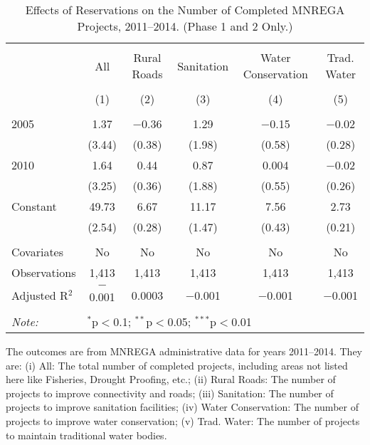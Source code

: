\begin{table}[!htbp]
\centering
\begin{threeparttable}

  \caption{Effects of Reservations on the Number of Completed MNREGA Projects, 2011--2014. (Phase 1 and 2 Only.)} 
  \label{main_mnrega_phase_1_2} 
\scriptsize 
\begin{tabular}{@{\extracolsep{0pt}}lccccc} 
\\[-1.8ex]\hline 
\hline \\[-1.8ex] 
 & All & Rural Roads & Sanitation & Water Conservation & Trad. Water \\ 
\\[-1.8ex] & (1) & (2) & (3) & (4) & (5)\\ 
\hline \\[-1.8ex] 
 2005 & 1.37 & $-$0.36 & 1.29 & $-$0.15 & $-$0.02 \\ 
  & (3.44) & (0.38) & (1.98) & (0.58) & (0.28) \\ 
  2010 & 1.64 & 0.44 & 0.87 & 0.004 & $-$0.02 \\ 
  & (3.25) & (0.36) & (1.88) & (0.55) & (0.26) \\ 
  Constant & 49.73 & 6.67 & 11.17 & 7.56 & 2.73 \\ 
  & (2.54) & (0.28) & (1.47) & (0.43) & (0.21) \\ 
 \hline \\[-1.8ex] 
Covariates & No & No & No & No & No \\ 
Observations & 1,413 & 1,413 & 1,413 & 1,413 & 1,413 \\ 
Adjusted R$^{2}$ & $-$0.001 & 0.0003 & $-$0.001 & $-$0.001 & $-$0.001 \\ 
\hline 
\hline \\[-1.8ex] 
\textit{Note:}  & \multicolumn{5}{l}{$^{*}$p$<$0.1; $^{**}$p$<$0.05; $^{***}$p$<$0.01} \\ 
\end{tabular} 
\begin{tablenotes}[flushleft]
\scriptsize
\item The outcomes are from MNREGA administrative data for years 2011--2014. They are: 
(i) All: The total number of completed projects, including areas not listed here like Fisheries, Drought Proofing, etc.;
(ii) Rural Roads: The number of projects to improve connectivity and roads;
(iii) Sanitation: The number of projects to improve sanitation facilities;
(iv) Water Conservation: The number of projects to improve water conservation;
(v) Trad. Water: The number of projects to maintain traditional water bodies.
\end{tablenotes}
\end{threeparttable}
\end{table}
